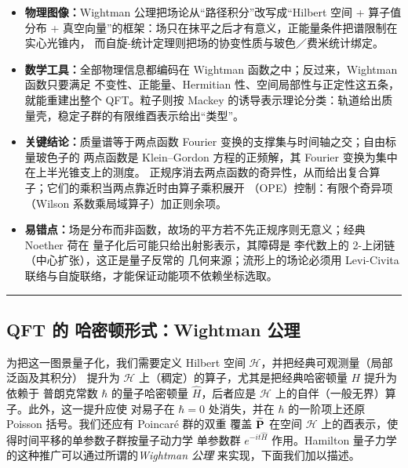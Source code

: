 
\begin{keytakeaways}
\begin{itemize}
  \item \textbf{物理图像：}Wightman 公理把场论从“路径积分”改写成“Hilbert 空间 + 算子值分布 +
        真空向量”的框架：场只在抹平之后才有意义，正能量条件把谱限制在实心光锥内，
        而自旋-统计定理则把场的协变性质与玻色／费米统计绑定。
  \item \textbf{数学工具：}全部物理信息都编码在 Wightman 函数之中；反过来，Wightman 函数只要满足
        不变性、正能量、Hermitian 性、空间局部性与正定性这五条，就能重建出整个 QFT。粒子则按 Mackey
        的诱导表示理论分类：轨道给出质量壳，稳定子群的有限维酉表示给出“类型”。
  \item \textbf{关键结论：}质量谱等于两点函数 Fourier 变换的支撑集与时间轴之交；自由标量玻色子的
        两点函数是 Klein--Gordon 方程的正频解，其 Fourier 变换为集中在上半光锥支上的测度。
        正规序消去两点函数的奇异性，从而给出复合算子；它们的乘积当两点靠近时由算子乘积展开
        （OPE）控制：有限个奇异项（Wilson 系数乘局域算子）加正则余项。
  \item \textbf{易错点：}场是分布而非函数，故场的平方若不先正规序则无意义；经典 Noether 荷在
        量子化后可能只给出射影表示，其障碍是 李代数上的 2-上闭链（中心扩张），这正是量子反常的
        几何来源；流形上的场论必须用 Levi-Civita 联络与自旋联络，才能保证动能项不依赖坐标选取。
\end{itemize}
\end{keytakeaways}

\bigskip
\noindent\rule{\textwidth}{0.6pt}
\bigskip

\subsection{QFT 的 哈密顿形式：Wightman 公理}

为把这一图景量子化，我们需要定义 Hilbert 空间 $\mathcal H$，并把经典可观测量（局部泛函及其积分）
提升为 $\mathcal H$ 上（稠定）的算子，尤其是把经典哈密顿量 $H$ 提升为依赖于 普朗克常数 $\hbar$
的量子哈密顿量 $\widehat H$，后者应是 $\mathcal H$ 上的自伴（一般无界）算子。此外，这一提升应使
对易子在 $\hbar=0$ 处消失，并在 $\hbar$ 的一阶项上还原 Poisson 括号。我们还应有 Poincar\'e 群的双重
覆盖 $\widetilde{\bold P}$ 在空间 $\mathcal H$ 上的酉表示，使得时间平移的单参数子群按量子动力学
单参数群 $e^{-it\widehat H}$ 作用。Hamilton 量子力学的这种推广可以通过所谓的\emph{Wightman 公理}
来实现，下面我们加以描述。

